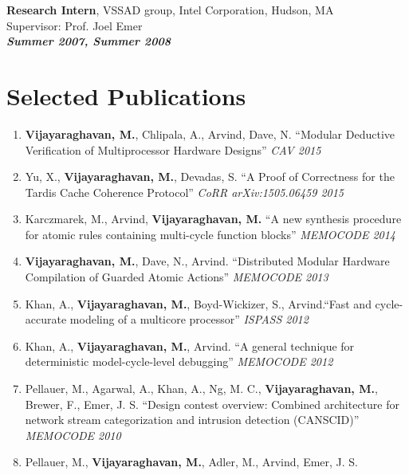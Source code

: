 \documentclass[margin]{resume}
\begin{document}
\begin{resume}
    \textbf{Research Intern}, VSSAD group, Intel Corporation, Hudson, MA\\
    Supervisor: Prof. Joel Emer \\
\hfill \textbf{\textit{Summer 2007, Summer 2008}}\\
    \section{\mysidestyle Selected Publications}
    \begin{enumerate}
    \item \textbf{Vijayaraghavan, M.}, Chlipala, A., Arvind, Dave, N.
    ``Modular Deductive Verification of Multiprocessor Hardware Designs'' \textit{CAV 2015}
    \item Yu, X., \textbf{Vijayaraghavan, M.}, Devadas, S.
    ``A Proof of Correctness for the Tardis Cache Coherence Protocol'' \textit{CoRR arXiv:1505.06459 2015}
    \item Karczmarek, M., Arvind, \textbf{Vijayaraghavan, M.}
    ``A new synthesis procedure for atomic rules containing multi-cycle function blocks'' \textit{MEMOCODE 2014}
    \item \textbf{Vijayaraghavan, M.}, Dave, N., Arvind.
    ``Distributed Modular Hardware Compilation of Guarded Atomic Actions'' \textit{MEMOCODE 2013}
    \item Khan, A., \textbf{Vijayaraghavan, M.}, Boyd-Wickizer, S., Arvind.``Fast and cycle-accurate modeling of 
    a multicore processor''
    \textit {ISPASS 2012}
    \item Khan, A., \textbf{Vijayaraghavan, M.}, Arvind. ``A general technique for deterministic model-cycle-level debugging''
    \textit{MEMOCODE 2012}
    \item Pellauer, M., Agarwal, A., Khan, A., Ng, M. C., \textbf{Vijayaraghavan, M.}, Brewer, F., Emer, J. S. 
    ``Design contest overview: Combined architecture for network stream categorization and intrusion detection (CANSCID)''
    \textit{MEMOCODE 2010}
    \item Pellauer, M., \textbf{Vijayaraghavan, M.}, Adler, M., Arvind, Emer, J. S.

\end{enumerate}
\end{resume}
\end{document}
